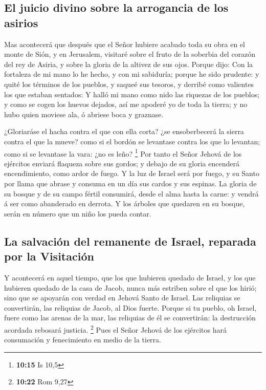 \hypertarget{el-juicio-divino-sobre-la-arrogancia-de-los-asirios}{%
\subsection{El juicio divino sobre la arrogancia de los
asirios}\label{el-juicio-divino-sobre-la-arrogancia-de-los-asirios}}

 Mas acontecerá que después que el Señor hubiere acabado
toda su obra en el monte de Sión, y en Jerusalem, visitaré sobre el
fruto de la soberbia del corazón del rey de Asiria, y sobre la gloria de
la altivez de sus ojos.  Porque dijo: Con la fortaleza de
mi mano lo he hecho, y con mi sabiduría; porque he sido prudente: y
quité los términos de los pueblos, y saqueé sus tesoros, y derribé como
valientes los que estaban sentados:  Y halló mi mano como
nido las riquezas de los pueblos; y como se cogen los huevos dejados,
así me apoderé yo de toda la tierra; y no hubo quien moviese ala, ó
abriese boca y graznase.

 ¿Gloriaráse el hacha contra el que con ella corta? ¿se
ensoberbecerá la sierra contra el que la mueve? como si el bordón se
levantase contra los que lo levantan; como si se levantase la vara: ¿no
es leño? \footnote{\textbf{10:15} Is 10,5}  Por tanto el
Señor Jehová de los ejércitos enviará flaqueza sobre sus gordos; y
debajo de su gloria encenderá encendimiento, como ardor de fuego.
 Y la luz de Israel será por fuego, y su Santo por llama
que abrase y consuma en un día sus cardos y sus espinas. 
La gloria de su bosque y de su campo fértil consumirá, desde el alma
hasta la carne: y vendrá á ser como abanderado en derrota.
 Y los árboles que quedaren en su bosque, serán en número
que un niño los pueda contar.

\hypertarget{la-salvaciuxf3n-del-remanente-de-israel-reparada-por-la-visitaciuxf3n}{%
\subsection{La salvación del remanente de Israel, reparada por la
Visitación}\label{la-salvaciuxf3n-del-remanente-de-israel-reparada-por-la-visitaciuxf3n}}

 Y acontecerá en aquel tiempo, que los que hubieren
quedado de Israel, y los que hubieren quedado de la casa de Jacob, nunca
más estriben sobre el que los hirió; sino que se apoyarán con verdad en
Jehová Santo de Israel.  Las reliquias se convertirán,
las reliquias de Jacob, al Dios fuerte.  Porque si tu
pueblo, oh Israel, fuere como las arenas de la mar, las reliquias de él
se convertirán: la destrucción acordada rebosará justicia. \footnote{\textbf{10:22}
  Rom 9,27}  Pues el Señor Jehová de los ejércitos hará
consumación y fenecimiento en medio de la tierra.

